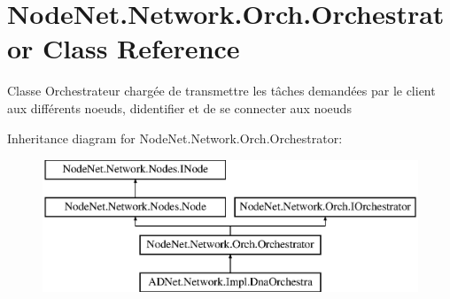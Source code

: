 \hypertarget{class_node_net_1_1_network_1_1_orch_1_1_orchestrator}{}\section{Node\+Net.\+Network.\+Orch.\+Orchestrator Class Reference}
\label{class_node_net_1_1_network_1_1_orch_1_1_orchestrator}


Classe Orchestrateur chargée de transmettre les tâches demandées par le client aux différents noeuds, d\textquotesingle{}identifier et de se connecter aux noeuds  


Inheritance diagram for Node\+Net.\+Network.\+Orch.\+Orchestrator\+:\begin{figure}[H]
\begin{center}
\leavevmode
\includegraphics[height=4.000000cm]{class_node_net_1_1_network_1_1_orch_1_1_orchestrator}
\end{center}
\end{figure}
